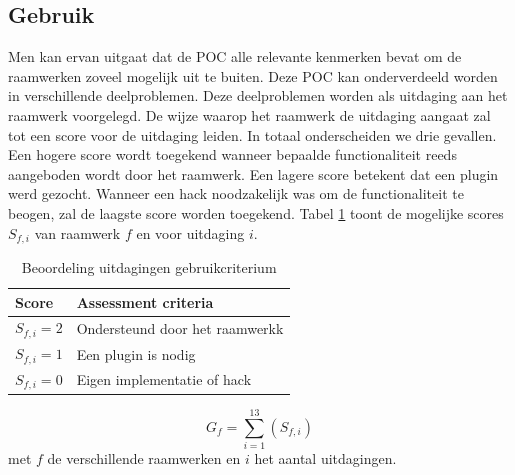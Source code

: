 \subsection{Gebruik}
\label{sec:vergelijking-gebruik}
Men kan ervan uitgaat dat de POC alle relevante kenmerken bevat om de raamwerken zoveel mogelijk uit te buiten. 
Deze POC kan onderverdeeld worden in verschillende deelproblemen.
Deze deelproblemen worden als uitdaging aan het raamwerk voorgelegd.
De wijze waarop het raamwerk de uitdaging aangaat zal tot een score voor de uitdaging leiden.
In totaal onderscheiden we drie gevallen.
Een hogere score wordt toegekend wanneer bepaalde functionaliteit reeds aangeboden wordt door het raamwerk. 
Een lagere score betekent dat een plugin werd gezocht. 
Wanneer een hack noodzakelijk was om de functionaliteit te beogen, zal de laagste score worden toegekend.
Tabel \ref{tabel:scores-uitdagingen} toont de mogelijke scores $S_{f,i}$ van raamwerk $f$ en voor uitdaging $i$.
\begin{table}[h]	
  \centering
  \begin{tabular}{ll}
    \toprule
    \textbf{Score} & \textbf{Assessment criteria}\\
    \midrule
    $S_{f,i} = 2$ & Ondersteund door het raamwerkk\\
    $S_{f,i} = 1$ & Een plugin is nodig\\
    $S_{f,i} = 0$ & Eigen implementatie of hack\\
    \bottomrule
  \end{tabular}
  \caption{Beoordeling uitdagingen gebruikcriterium}
  \label{tabel:scores-uitdagingen}
\end{table}
\begin{equation}
  G_f = \sum_{i=1}^{13}{\left(S_{f,i}\right)}
  \label{eq:gebruik}
\end{equation}
met $f$ de verschillende raamwerken en $i$ het aantal uitdagingen.


